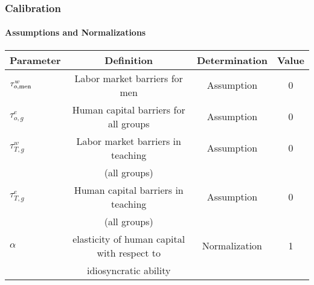 \documentclass[11pt]{beamer}
\begin{document}
		\begin{frame}
			\frametitle{Calibration}
			\framesubtitle{Assumptions and Normalizations}
			\scriptsize

			\begin{table}[h!]
				\centering
				\begin{tabular}{lccc}
					\toprule
					\toprule
					Parameter & Definition & Determination & Value\\
					\midrule
					$\tau^{w}_{o,{\rm men}}$ & Labor market barriers for men & Assumption & 0 \\
					$\tau^{e}_{o,g}$ & Human capital barriers for all groups & Assumption & 0 \\
					$\tau^{w}_{T,g}$ & Labor market barriers in teaching  & Assumption & 0 \\
					& (all groups)&\\
					$\tau^{e}_{T,g}$ & Human capital barriers in teaching & Assumption & 0 \\
					& (all groups) & \\
					$\alpha$ & elasticity of human capital with respect to & Normalization & 1 \\
					& idiosyncratic ability & \\
					\bottomrule
				\end{tabular}
				\label{tab:assump}
			\end{table}
		\end{frame}
		
\end{document}

